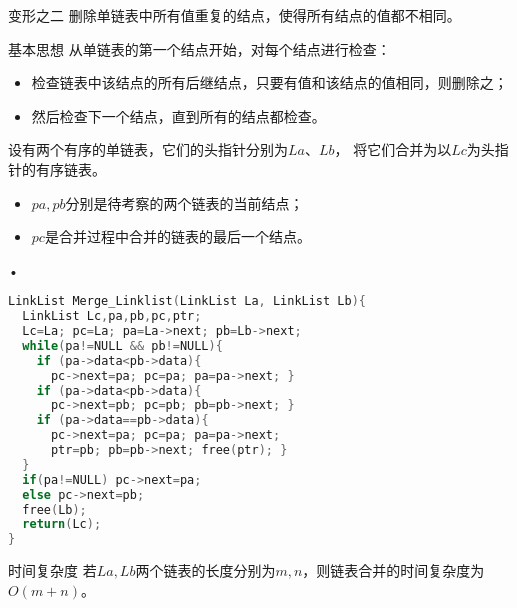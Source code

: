 
\begin{frame}[fragile]\ft{\subsecname}
\begin{block}{变形之二}
删除单链表中所有值重复的结点，使得所有结点的值都不相同。
\end{block}
\pause 
\begin{block}{基本思想}
从单链表的第一个结点开始，对每个结点进行检查：
\begin{itemize}
\item
检查链表中该结点的所有后继结点，只要有值和该结点的值相同，则删除之；
\item
然后检查下一个结点，直到所有的结点都检查。
\end{itemize}
\end{block}


\end{frame}


\begin{frame}[fragile]\ft{\subsecname}


 
 
\end{frame}


\begin{frame}
设有两个有序的单链表，它们的头指针分别为$La$、$Lb$，
将它们合并为以$Lc$为头指针的有序链表。 
 
\end{frame}


\begin{frame}\ft{\subsecname}

  
 

\pause 
\begin{itemize}
\item $pa,pb$分别是待考察的两个链表的当前结点；
\item $pc$是合并过程中合并的链表的最后一个结点。
\end{itemize}•
\end{frame}


\begin{frame}[fragile]\ft{\subsecname}
\begin{lstlisting}[language=C]
LinkList Merge_Linklist(LinkList La, LinkList Lb){
  LinkList Lc,pa,pb,pc,ptr; 
  Lc=La; pc=La; pa=La->next; pb=Lb->next;
  while(pa!=NULL && pb!=NULL){
    if (pa->data<pb->data){
      pc->next=pa; pc=pa; pa=pa->next; }
    if (pa->data<pb->data){
      pc->next=pb; pc=pb; pb=pb->next; }
    if (pa->data==pb->data){
      pc->next=pa; pc=pa; pa=pa->next;
      ptr=pb; pb=pb->next; free(ptr); }
  }
  if(pa!=NULL) pc->next=pa;
  else pc->next=pb;
  free(Lb);
  return(Lc);
}
\end{lstlisting}
\end{frame}


\begin{frame}[fragile]\ft{\subsecname}
\begin{block}{时间复杂度}
若$La,Lb$两个链表的长度分别为$m,n$，则链表合并的时间复杂度为$O(m+n)$。
\end{block}
\end{frame}

